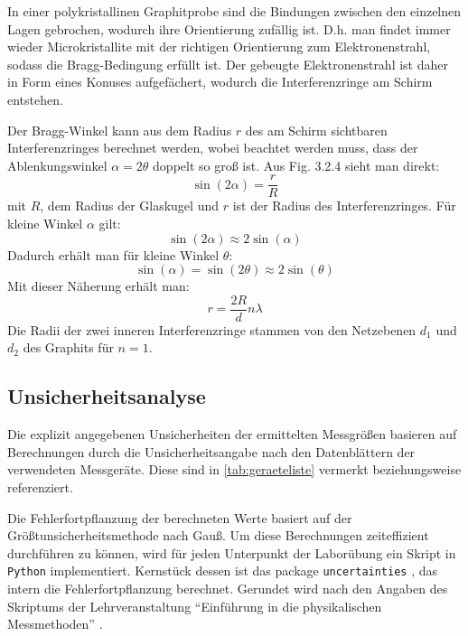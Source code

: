 \documentclass[ngerman]{scrartcl}
\begin{document}
In einer polykristallinen Graphitprobe sind die Bindungen zwischen den einzelnen Lagen gebrochen, wodurch ihre Orientierung zufällig ist. D.h. man findet immer wieder
Microkristallite mit der richtigen Orientierung zum Elektronenstrahl, sodass die Bragg-Bedingung erfüllt ist. Der gebeugte Elektronenstrahl ist daher in Form eines Konuses aufgefächert, wodurch die Interferenzringe am Schirm entstehen.

Der Bragg-Winkel kann aus dem Radius $r$ des am Schirm sichtbaren Interferenzringes berechnet werden, wobei beachtet werden muss, dass der Ablenkungswinkel $\alpha = 2\theta$ doppelt so groß ist. Aus Fig. 3.2.4 sieht man direkt: %
%
\begin{equation}
    \label{eq:ablenkwinkel_radius}
    \sin(2\alpha) = \frac{r}{R}
\end{equation}
%
mit $R$, dem Radius der Glaskugel und $r$ ist der Radius des Interferenzringes. Für kleine Winkel $\alpha$ gilt:
%
\[\sin(2\alpha) \approx 2\sin(\alpha)\]
%
Dadurch erhält man für kleine Winkel $\theta$:
%
\[\sin(\alpha)=\sin(2\theta)\approx2\sin(\theta)\]
%
Mit dieser Näherung erhält man:
%
\begin{equation}
    \label{eq:radius_wellenlaenge}
    r=\frac{2R}{d}n\lambda
\end{equation}
%
Die Radii der zwei inneren Interferenzringe stammen von den Netzebenen $d_1$ und $d_2$ des Graphits für $n=1$.


\subsection{Unsicherheitsanalyse}
\label{subsec:unsicherheitsanalyse}

Die explizit angegebenen Unsicherheiten der ermittelten Messgrößen basieren auf Berechnungen durch die Unsicherheitsangabe nach den Datenblättern der verwendeten Messgeräte. Diese sind in \autoref{tab:geraeteliste} vermerkt beziehungsweise referenziert.

Die Fehlerfortpflanzung der berechneten Werte basiert auf der Größtunsicherheitsmethode nach Gauß. Um diese Berechnungen zeiteffizient durchführen zu können, wird für jeden Unterpunkt der Laborübung ein Skript in \verb!Python! implementiert. Kernstück dessen ist das package \verb!uncertainties! \cite{ref:uncertainties}, das intern die Fehlerfortpflanzung berechnet. Gerundet wird nach den Angaben des Skriptums der Lehrveranstaltung \enquote{Einführung in die physikalischen Messmethoden} \cite{ref:messmethoden}.
\end{document}
